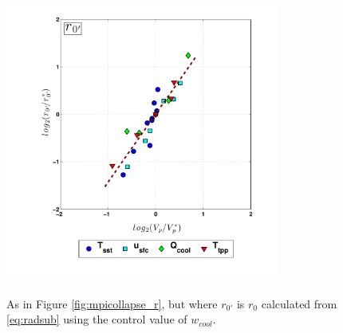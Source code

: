 \documentclass[12pt]{article}
\begin{document}
\begin{figure}[h!]
\centering
  \noindent\includegraphics[width=9cm,height=10cm]{FIGURES_TC_RCE_equilibrium_v2.0/Fig5_MPI_collapse_r0ctrlwcool.pdf}
\caption{As in Figure \ref{fig:mpicollapse_r}, but where $r_{0'}$ is $r_0$ calculated from \eqref{eq:radsub} using the control value of $w_{cool}$.}
\label{fig:mpicollapse_r0ctrlwcool}
\end{figure}
\end{document}
